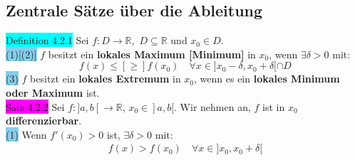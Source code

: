 \documentclass[landscape, 10pt]{article}
\newcommand{\R}{\mathbb{R}}
\begin{document}
\begin{multicols}{3}
       \subsection{Zentrale Sätze über die Ableitung}
              \colorbox{cyan}{Definition 4.2.1} 
                     Sei \textcolor{NavyBlue}{
                     $f:D\longrightarrow\R$},\,
                     \textcolor{NavyBlue}{$D\subseteq\R$}
                     und \textcolor{NavyBlue}{$x_0\in D$}. \\
                     \colorbox{SkyBlue}{(1)[(2)]}
                            \textcolor{NavyBlue}{$f$} 
                            besitzt ein 
                            \textbf{lokales Maximum [Minimum]} in 
                            \textcolor{NavyBlue}{$x_0$}, wenn 
                            \textcolor{NavyBlue}{
                            $\exists\delta>0$} mit: 
                            \begin{equation*}
                                   f(x)\leqslant[\geqslant] 
                                   f(x_0)\quad
                                   \forall x
                                   \in]x_0-\delta,x_0+\delta[
                                   \cap D
                            \end{equation*}
                     \colorbox{SkyBlue}{(3)} 
                            $f$ besitzt ein 
                            \textbf{lokales Extremum} 
                            in \textcolor{NavyBlue}{$x_0$}, 
                            wenn es ein 
                            \textbf{lokales Minimum oder 
                            Maximum} ist. \\
              \colorbox{magenta}{Satz 4.2.2} 
                     Sei \textcolor{NavyBlue}{
                     $f:]a,b[\longrightarrow\R,\,x_0\in]a,b[$}. 
                     Wir nehmen an, \textcolor{NavyBlue}{$f$} 
                     ist in 
                     \textcolor{NavyBlue}{$x_0$} 
                     \textbf{differenzierbar}.\\
                     \colorbox{SkyBlue}{(1)} 
                            Wenn \textcolor{NavyBlue}{
                            $f'(x_0)>0$} 
                            ist, \textcolor{NavyBlue}{
                            $\exists\delta>0$} mit: 
                            \begin{align*}
                                   f(x)>f(x_0)\quad
                                   \forall x
                                   \in]x_0,x_0+\delta[ \\

\end{align*}
\end{multicols}
\end{document}
